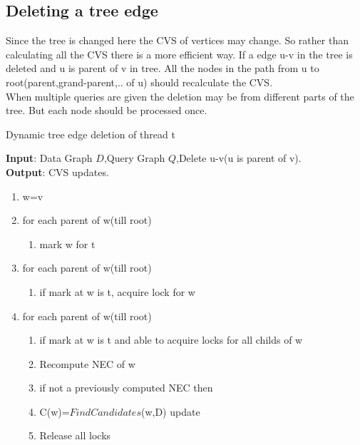 \subsection{Deleting a tree edge}	
	\hspace{10mm} Since the tree is changed here the CVS of vertices may change. So rather than calculating all the CVS there is a more efficient way. If a edge u-v in the tree is deleted and u is parent of v in tree. All the nodes in the path from u to root(parent,grand-parent,.. of u) should recalculate the CVS.\\
	 \hspace{10mm} When multiple queries are given the deletion may be from different parts of the tree. But each node should be processed once. 
\begin{algorithm}[H]
\caption{Dynamic tree edge deletion of thread t}
\textbf{Input}: Data Graph $D$,Query Graph $Q$,Delete u-v(u is parent of v).\\
\textbf{Output}: CVS updates.\\
\begin{algorithmic}
 \item \begin{enumerate}
 \item w=v
\item for each parent of w(till root)
 \begin{enumerate}
\item mark w for t
\end{enumerate}
\item for each parent of w(till root)
 \begin{enumerate}
\item if mark at w is t, acquire lock for w
\end{enumerate}
\item for each parent of w(till root)
\begin{enumerate}
\item if mark at w is t and able to acquire locks for all childs of w 
\item Recompute NEC of w
\item if not a previously computed NEC then
\item  \hspace{10mm}C(w)=$FindCandidates$(w,D) update
\item Release all locks
\end{enumerate}
\end{enumerate}
\end{algorithmic}
\label{alg:treeedge}
\end{algorithm}

